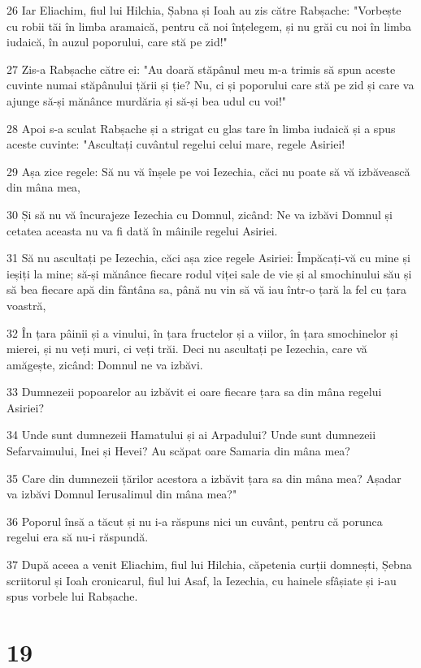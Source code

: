 \par 26 Iar Eliachim, fiul lui Hilchia, Șabna și Ioah au zis către Rabșache: "Vorbește cu robii tăi în limba aramaică, pentru că noi înțelegem, și nu grăi cu noi în limba iudaică, în auzul poporului, care stă pe zid!"
\par 27 Zis-a Rabșache către ei: "Au doară stăpânul meu m-a trimis să spun aceste cuvinte numai stăpânului țării și ție? Nu, ci și poporului care stă pe zid și care va ajunge să-și mănânce murdăria și să-și bea udul cu voi!"
\par 28 Apoi s-a sculat Rabșache și a strigat cu glas tare în limba iudaică și a spus aceste cuvinte: "Ascultați cuvântul regelui celui mare, regele Asiriei!
\par 29 Așa zice regele: Să nu vă înșele pe voi Iezechia, căci nu poate să vă izbăvească din mâna mea,
\par 30 Și să nu vă încurajeze Iezechia cu Domnul, zicând: Ne va izbăvi Domnul și cetatea aceasta nu va fi dată în mâinile regelui Asiriei.
\par 31 Să nu ascultați pe Iezechia, căci așa zice regele Asiriei: Împăcați-vă cu mine și ieșiți la mine; să-și mănânce fiecare rodul viței sale de vie și al smochinului său și să bea fiecare apă din fântâna sa, până nu vin să vă iau într-o țară la fel cu țara voastră,
\par 32 În țara pâinii și a vinului, în țara fructelor și a viilor, în țara smochinelor și mierei, și nu veți muri, ci veți trăi. Deci nu ascultați pe Iezechia, care vă amăgește, zicând: Domnul ne va izbăvi.
\par 33 Dumnezeii popoarelor au izbăvit ei oare fiecare țara sa din mâna regelui Asiriei?
\par 34 Unde sunt dumnezeii Hamatului și ai Arpadului? Unde sunt dumnezeii Sefarvaimului, Inei și Hevei? Au scăpat oare Samaria din mâna mea?
\par 35 Care din dumnezeii țărilor acestora a izbăvit țara sa din mâna mea? Așadar va izbăvi Domnul Ierusalimul din mâna mea?"
\par 36 Poporul însă a tăcut și nu i-a răspuns nici un cuvânt, pentru că porunca regelui era să nu-i răspundă.
\par 37 După aceea a venit Eliachim, fiul lui Hilchia, căpetenia curții domnești, Șebna scriitorul și Ioah cronicarul, fiul lui Asaf, la Iezechia, cu hainele sfâșiate și i-au spus vorbele lui Rabșache.

\chapter{19}

